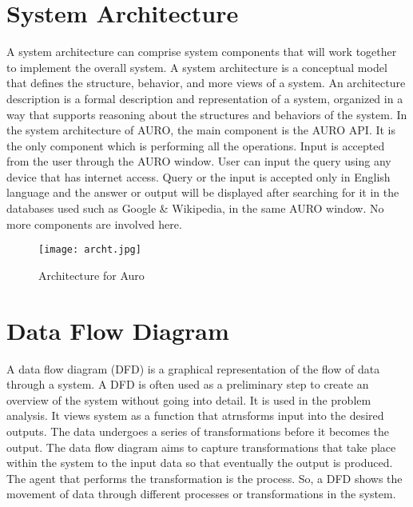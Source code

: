 \section{System Architecture}
A system architecture can comprise system components that will work together to implement the overall system. 
A system architecture is a conceptual model that defines the structure, behavior, and more views of a system. An architecture description is a formal description and representation of a system, organized in a way that 
supports reasoning about the structures and behaviors of the system.
\newline
In the system architecture of AURO, the main component is the AURO API. It is the only component which is performing all the operations.  Input is accepted from the user through the AURO window. User can input the query using any device that has internet access.
\newline
Query or the input is accepted only in English language and the answer or output will be displayed after searching for it in the databases used such as Google & Wikipedia, in the same AURO window. No more components are involved here.
\vspace{1cm}
\begin{figure}[!h]
  \hspace{.3cm}
  \texttt{[image: archt.jpg]} 
  \caption{Architecture for Auro}
  \label{fig:archt}
\end{figure}

\section{Data Flow Diagram}
A data flow diagram (DFD) is a graphical representation of the flow of data through a system. A DFD is often used as a preliminary step to create an overview of the system without going into detail. It is used in the problem analysis. It views system as a function that atrnsforms input into the desired outputs. The data undergoes a series of transformations before it becomes the output. The data flow diagram aims to capture transformations that take place within the system to the input data so that eventually the output is produced. The agent that performs the transformation is the process. So, a DFD shows the movement of data through different processes or transformations in the system.

